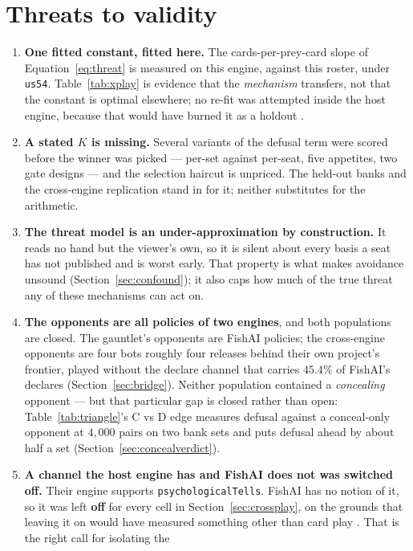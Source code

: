 \documentclass[11pt]{article}
\newcommand{\code}[1]{\texttt{#1}}
\newcommand{\usff}{\code{us54}}
\begin{document}
\section{Threats to validity}
\label{sec:threats}

\begin{enumerate}
\item \textbf{One fitted constant, fitted here.} The cards-per-prey-card slope of
  Equation~\eqref{eq:threat} is measured on this engine, against this roster, under \usff{}.
  Table~\ref{tab:xplay} is evidence that the \emph{mechanism} transfers, not that the constant is
  optimal elsewhere; no re-fit was attempted inside the host engine, because that would have burned
  it as a holdout \cite{crossplay}.
\item \textbf{A stated $K$ is missing.} Several variants of the defusal term were scored before the
  winner was picked --- per-set against per-seat, five appetites, two gate designs --- and the
  selection haircut is unpriced. The held-out banks and the cross-engine replication stand in for
  it; neither substitutes for the arithmetic.
\item \textbf{The threat model is an under-approximation by construction.} It reads no hand but the
  viewer's own, so it is silent about every basis a seat has not published and is worst early. That
  property is what makes avoidance unsound (Section~\ref{sec:confound}); it also caps how much of
  the true threat any of these mechanisms can act on.
\item \textbf{The opponents are all policies of two engines}, and both populations are closed. The
  gauntlet's opponents are FishAI policies; the cross-engine opponents are four bots roughly four
  releases behind their own project's frontier, played without the declare channel that carries
  $45.4\%$ of FishAI's declares (Section~\ref{sec:bridge}). Neither population contained a
  \emph{concealing} opponent --- but that particular gap is closed rather than open:
  Table~\ref{tab:triangle}'s C vs D edge measures defusal against a conceal-only opponent at
  $4{,}000$ pairs on two bank sets and puts defusal ahead by about half a set
  (Section~\ref{sec:concealverdict}).
\item \textbf{A channel the host engine has and FishAI does not was switched off.} Their engine
  supports \code{psychologicalTells}. FishAI has no notion of it, so it was left \textbf{off} for
  every cell in Section~\ref{sec:crossplay}, on the grounds that leaving it on would have measured
  something other than card play \cite{crossplay}. That is the right call for isolating the

\end{enumerate}
\end{document}
